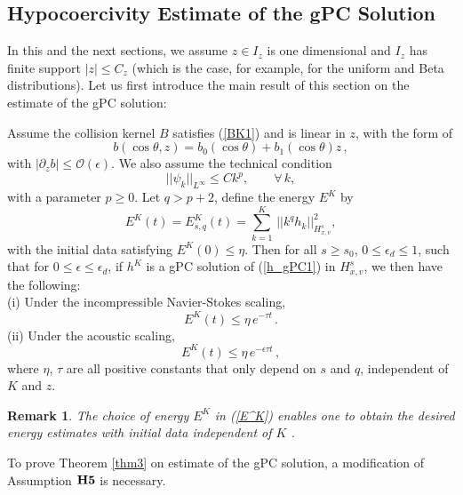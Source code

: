 \documentclass[final,onefignum,onetabnum]{siamart171218}
\newcounter{example}
\newtheorem{remark}[theorem]{Remark}
\begin{document}
\subsection{Hypocoercivity Estimate of the gPC Solution}
\label{gPC1}
In this and the next sections, we assume $z\in I_z$ is one dimensional and $I_z$ has finite support $|z|\leq C_z$ (which is the case, for example, for the uniform and Beta distributions). Let us first introduce the main result of this section on the estimate of the gPC solution:
\begin{theorem}
\label{thm3}
Assume the collision kernel $B$ satisfies (\ref{BK1}) and is linear in $z$, with the form of
\begin{equation}\label{b1} b(\cos\theta, z)= b_0(\cos\theta)+  b_1(\cos\theta)z\,,  \end{equation}
with $|\partial_z b|\leq \mathcal O(\epsilon)$.
We also assume the technical condition
\begin{equation}\label{basis}
||\psi_k||_{L^{\infty}} \leq C k^p, \qquad \forall\, k,  \end{equation}
with a parameter $p \geq 0$. Let $q>p+2$, define the energy $E^{K}$ by
\begin{equation}\label{E^K}
  E^{K}(t) = E_{s,q}^{K}(t) = \sum_{k=1}^{K}\, ||k^q h_k||_{H_{x,v}^s}^2,
\end{equation}
with the initial data satisfying $E^{K}(0) \leq \eta$.
Then for all $s\geq s_0$, $0\leq \epsilon_d\leq 1$, such that
for $0\leq \epsilon\leq \epsilon_d$, if $h^K$ is a gPC solution of (\ref{h_gPC1}) in
$H_{x,v}^s$, we then have the following:  \\
(i) Under the incompressible Navier-Stokes scaling, 
$$E^{K}(t)\leq \eta \, e^{-\tau t}\,. $$
(ii) Under the acoustic scaling, 
$$E^{K}(t) \leq \eta \, e^{-\epsilon \tau t}\,, $$
where $\eta$, $\tau$ are all positive constants that only depend on $s$ and $q$, independent of $K$ and $z$.
\end{theorem}
\begin{remark}
The choice of energy  $E^K$ in (\ref{E^K}) enables one to obtain
the desired energy estimates with initial data independent of $K$ \cite{Rui}.
\end{remark}

To prove Theorem \ref{thm3} on estimate of the gPC solution, a modification of Assumption ${\bf H5}$ is necessary. 
\\[1pt]
\end{document}
